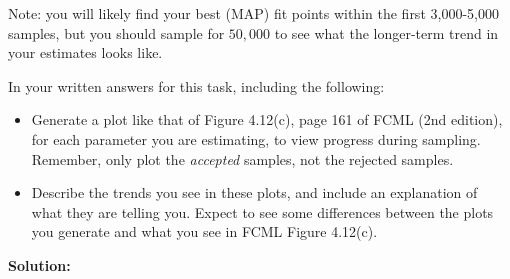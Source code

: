 \documentclass[10pt]{article}
\begin{document}
\begin{enumerate}
Note: you will likely find your best (MAP) fit points within the first 3,000-5,000 samples, but you should sample for $50,000$ to see what the longer-term trend in your estimates looks like.

In your written answers for this task, including the following: 
\begin{itemize}
\item Generate a plot like that of Figure 4.12(c), page 161 of FCML (2nd edition), for each parameter you are estimating, to view progress during sampling.  Remember, only plot the {\em accepted} samples, not the rejected samples.


\item Describe the trends you see in these plots, and include an explanation of what they are telling you.  Expect to see some differences between the plots you generate and what you see in FCML Figure 4.12(c).


\end{itemize}

\textbf{Solution:}


\end{enumerate}
\end{document}
